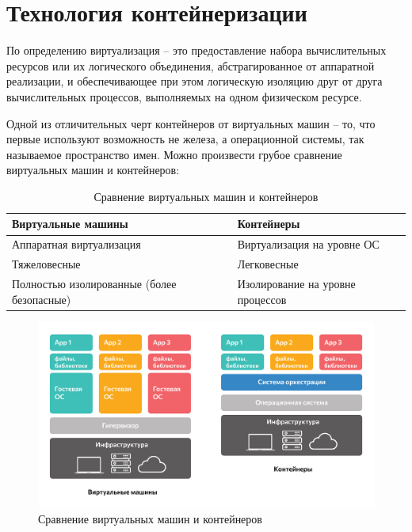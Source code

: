 \section{Технология контейнеризации}
По определению виртуализация -- это предоставление набора вычислительных
ресурсов или их логического объединения, абстрагированное от аппаратной
реализации, и обеспечивающее при этом логическую изоляцию друг от друга
вычислительных процессов, выполняемых на одном физическом ресурсе.

Одной из отличительных черт контейнеров от виртуальных машин -- то, что первые
используют возможность не железа, а операционной системы, так называемое
пространство имен. Можно произвести грубое сравнение виртуальных машин и
контейнеров:
\begin{table}[H]
    \centering
    \begin{tabular}{|l|l|}
        \hline
        {\bf Виртуальные машины}                   & {\bf Контейнеры} \\\hline
        Аппаратная виртуализация                   & Виртуализация на уровне ОС \\\hline
        Тяжеловесные                               & Легковесные \\\hline
        Полностью изолированные (более безопасные) & Изолирование на уровне процессов \\\hline
    \end{tabular}
    \caption{Сравнение виртуальных машин и контейнеров}
\end{table}
\begin{figure}[H]
    \centering
    \includegraphics[scale=0.25]{inc/img/cont-vs-virt.png}
    \caption{Сравнение виртуальных машин и контейнеров}
\end{figure}

